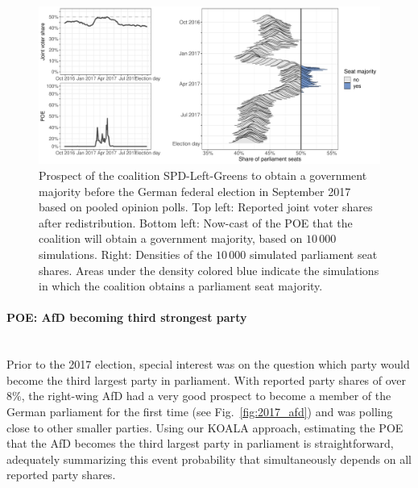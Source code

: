 \documentclass[smallextended]{svjour3}      %
\begin{document}
\begin{figure}[H]\centering
\includegraphics[width=1\textwidth]{figures/spd_2017_joint.pdf}
\caption{Prospect of the coalition SPD-Left-Greens to obtain a government majority before the
German federal election in September 2017 based on pooled opinion polls.
Top left: Reported joint voter shares after redistribution.
Bottom left: Now-cast of the POE that the coalition will obtain a government
majority, based on $10\,000$ simulations.
Right: Densities of the $10\,000$ simulated parliament seat shares. Areas under
the density colored blue indicate the simulations in which the coalition
obtains a parliament seat majority.
\label{fig:2017_spdleftgreens}
}
\end{figure}

\paragraph{POE: AfD becoming third strongest party} \ \\
Prior to the 2017 election, special interest was on the question
which party would become the third largest party in parliament.
With reported party shares of over $8\%$, the right-wing AfD had a very good
prospect to become a member of the German parliament for the first time
(see Fig.~\ref{fig:2017_afd}) and was polling close to other smaller parties.
Using our KOALA approach, estimating the POE that the AfD becomes
the third largest party in parliament is straightforward, adequately summarizing
this event probability that simultaneously depends on all reported party shares.
\end{document}
